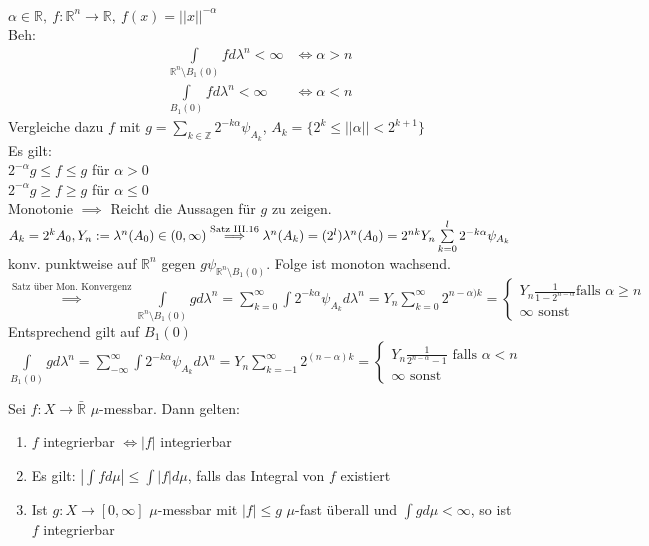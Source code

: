   \begin{example}
    $\alpha \in \mathbb{R}, \ f:\mathbb{R}^n \to \mathbb{R}, \ f(x) = ||x||^{-\alpha}$\\
    Beh: 
    \begin{align*}
      \int\limits_{\mathbb{R}^n \setminus B_1(0)} f d\lambda^n < \infty &\Leftrightarrow \alpha > n\\
      \int\limits_{B_1(0)} f d\lambda^n < \infty &\Leftrightarrow \alpha < n
    \end{align*}
    Vergleiche dazu $f$ mit $g = \sum\limits_{k\in\mathbb{Z}} 2^{-k \alpha} \psi_{A_k}$, $A_k = \{2^k \leq ||\alpha|| < 2^{k+1}  \}$ \\
    Es gilt: \\
    $2^{-\alpha} g \leq  f \leq g$ für $\alpha > 0$ \\
    $2^{-\alpha} g \geq f \geq g$ für $\alpha \leq 0$ \\ 
    Monotonie $\implies$ Reicht die Aussagen für $g$ zu zeigen. \\
    $A_k = 2^k A_0, Y_n := \lambda^n (A_0) \in (0,\infty) \\
    \overset{\text{Satz III.16}}{\implies} \lambda^n (A_k) = (2^l) \lambda^n(A_0) = 2^{nk}Y_n\\
    \sum\limits_{k=0}^l 2^{-k\alpha}\psi_{A_k}$ konv. punktweise auf $\mathbb{R}^n$ gegen $g\psi_{\mathbb{R}^n\setminus B_1(0)}$. Folge ist monoton wachsend. \\
    $\overset{\text{Satz über Mon. Konvergenz}}{\implies} \int\limits_{\mathbb{R}^n\setminus B_1(0)} g d\lambda^n = \sum\limits_{k=0}^\infty \int 2^{-k\alpha}\psi_{A_k} d\lambda^n = Y_n \sum\limits_{k=0}^\infty 2^{n-\alpha)k} = \begin{cases}Y_n \frac{1}{1-2^{n-\alpha}} \text{falls } \alpha \geq n \\ \infty \text{ sonst } \end{cases}$ \\
    Entsprechend gilt auf $B_1(0)$ \\
    $\int\limits_{B_1(0)}g d\lambda^n = \sum\limits_{-\infty}^\infty \int 2^{-k\alpha}\psi_{A_k} d\lambda^n = Y_n \sum\limits_{k=-1}^\infty 2^{(n-\alpha)k} = \begin{cases} Y_n \frac{1}{2^{n-\alpha}-1} \text{ falls } \alpha < n \\ \infty \text{ sonst }\end{cases}$
  \end{example}

  \begin{theorem}
    Sei $f: X \to \bar{\mathbb{R}}$ $\mu$-messbar. Dann gelten:
    \begin{enumerate}[label=\roman*)]
      \item $f$ integrierbar $\Leftrightarrow |f|$ integrierbar
      \item Es gilt: $|\int f d\mu| \leq \int |f| d\mu$, falls das Integral von $f$ existiert
      \item Ist $g: X \to [0, \infty]$ $\mu$-messbar mit $|f| \leq g$ $\mu$-fast überall und $\int g d\mu < \infty$, so ist $f$ integrierbar 
    \end{enumerate}
  \end{theorem}

